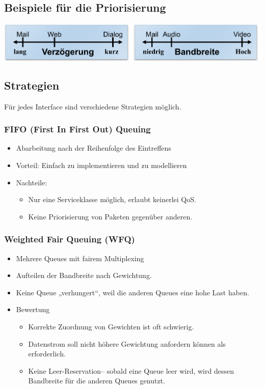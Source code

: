 \documentclass{article} %
\begin{document}
\subsection{Beispiele für die Priorisierung}
\begin{center}
	\includegraphics[width=15cm]{img/prio.png}
\end{center}

\subsection{Strategien}
Für jedes Interface sind verschiedene Strategien möglich. 	
\subsubsection{FIFO (First In First Out) Queuing}
	\begin{itemize}
	\item Abarbeitung nach der Reihenfolge des Eintreffens
	\item Vorteil: Einfach zu implementieren und zu modellieren
	\item Nachteile:
		\begin{itemize}
		\item Nur eine Serviceklasse möglich, erlaubt keinerlei QoS. 
		\item Keine Priorisierung von Paketen gegenüber anderen. 
		\end{itemize}
	\end{itemize}

\subsubsection{Weighted Fair Queuing (WFQ)}
	\begin{itemize}
	\item Mehrere Queues mit fairem Multiplexing
	\item Aufteilen der Bandbreite nach Gewichtung. 
	\item Keine Queue „verhungert“,  weil die anderen Queues eine hohe Last haben. 
	\item Bewertung
		\begin{itemize}
		\item Korrekte Zuordnung von Gewichten ist oft schwierig.  
		\item Datenstrom soll nicht höhere Gewichtung anfordern können als erforderlich.
		\item Keine \glqq Leer-Reservation\grqq – sobald eine Queue leer wird, wird dessen Bandbreite für die anderen Queues genutzt. 
		\end{itemize}
	\end{itemize}
\end{document}
